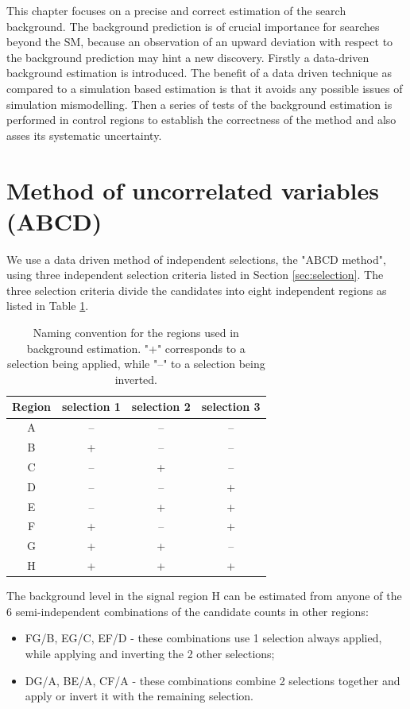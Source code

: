 This chapter focuses on a precise and correct estimation of the search background. The
background prediction is of crucial importance for searches beyond the SM, because an observation
of an upward deviation with respect to the background prediction may hint a new discovery.
Firstly a data-driven background estimation is introduced. The benefit of a data driven technique
as compared to a simulation based estimation is that it avoids any possible issues of 
simulation mismodelling. Then a series of tests of the background estimation is performed 
in control regions to establish the correctness of the method and also asses
its systematic uncertainty.


\section{Method of uncorrelated variables (ABCD)}
\label{sec:abcd}
We use a data driven method of independent selections, the "ABCD method", using
 three independent selection criteria listed in Section \ref{sec:selection}. 
The three selection criteria divide the candidates into eight
independent regions as listed in Table \ref{tab:regions}.

\begin{table}[htbp]
\centering
\caption{Naming convention for the regions used in background estimation. "+" corresponds to a selection 
being applied, while "--" to a selection being inverted. \label{tab:regions}}
\begin{tabular}{cccc}
 \hline
  Region & selection 1 & selection 2 & selection 3 \\
 \hline
 A & -- & -- & -- \\
 B & + & -- & -- \\
 C & -- & + & -- \\
 D & -- & -- & + \\
 E & -- & + & + \\
 F & + & -- & + \\
 G & + & + & -- \\
 H & + & + & + \\
\hline
\end{tabular} 
\end{table}

The background level in the signal region H can be estimated from anyone of the 6 semi-independent combinations
of the candidate counts in other regions:
\begin{itemize}
\item FG/B, EG/C, EF/D - these combinations use 1 selection always applied, while applying and inverting the 
2 other selections;
\item DG/A, BE/A, CF/A - these combinations combine 2 selections together and apply or invert it with the 
remaining selection.
\end{itemize}


